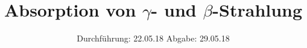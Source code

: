 

\subject{V704}
\title{Absorption von {\texorpdfstring{$\gamma$}{Gamma}}- und {\texorpdfstring{$\beta$}{Beta}}-Strahlung}
\date{%
  Durchführung: 22.05.18
  \hspace{3em}
  Abgabe: 29.05.18
}



\maketitle
\thispagestyle{empty}
\tableofcontents
\newpage







\printbibliography{}


